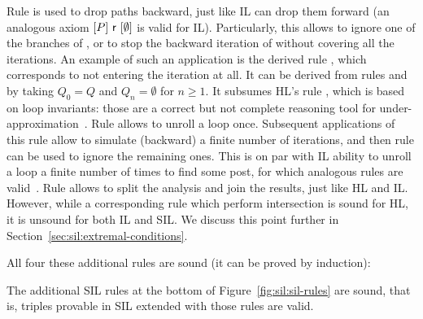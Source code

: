 Rule  is used to drop paths backward, just like IL can drop them forward (an analogous axiom $[P]~\mathsf{r}~[\emptyset]$ is valid for IL). Particularly, this allows to ignore one of the branches of , or to stop the backward iteration of  without covering all the iterations. An example of such an application is the derived rule , which corresponds to not entering the iteration at all. It can be derived from rules  and  by taking $Q_0 = Q$ and $Q_n = \emptyset$ for $n \ge 1$. It subsumes HL's rule , which is based on loop invariants: those are a correct but not complete reasoning tool for under\hyp{}approximation~\cite{OHearn20}.
Rule  allows to unroll a loop once. Subsequent applications of this rule allow to simulate (backward) a finite number of iterations, and then rule  can be used to ignore the remaining ones. This is on par with IL ability to unroll a loop a finite number of times to find some post, for which analogous rules are valid~\cite{OHearn20,MOH21}.
Rule  allows to split the analysis and join the results, just like HL and IL. However, while a corresponding rule  which perform intersection is sound for HL, it is unsound for both IL and SIL. We discuss this point further in Section~\ref{sec:sil:extremal-conditions}.

All four these additional rules are sound (it can be proved by induction):
\begin{prop}\label{prop:sil:sil-additional-soundness}
	The additional SIL rules at the bottom of Figure~\ref{fig:sil:sil-rules} are sound, that is, triples provable in SIL extended with those rules are valid.
\end{prop}


